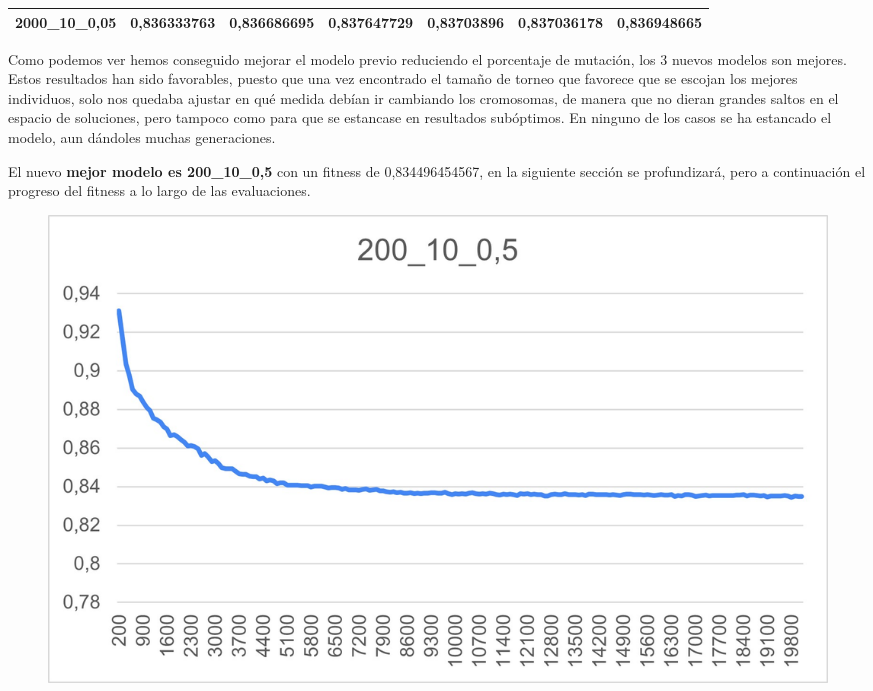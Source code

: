 \documentclass[12pt, spanish, pdftex]{UC3M_document}
\begin{document}
\begin{table}[H]
{\begin{tabular}{|l|l|l|l|l|l|l|}
			2000\_10\_0,05                                                                       & \cellcolor[HTML]{63BE7B}0,836333763                                            & \cellcolor[HTML]{B1D47F}0,836686695                                            & \cellcolor[HTML]{F8696B}0,837647729                                            & \cellcolor[HTML]{FFEB84}0,83703896                                             & \cellcolor[HTML]{FFEB84}0,837036178                                            & \cellcolor[HTML]{FDC67D}0,836948665                                                \\ \hline
		\end{tabular}%
	}
\end{table}

Como podemos ver hemos conseguido mejorar el modelo previo reduciendo el porcentaje de mutación, los 3 nuevos modelos son mejores. Estos resultados han sido favorables, puesto que una vez encontrado el tamaño de torneo que favorece que se escojan los mejores individuos, solo nos quedaba ajustar en qué medida debían ir cambiando los cromosomas, de manera que no dieran grandes saltos en el espacio de soluciones, pero tampoco como para que se estancase en resultados subóptimos. En ninguno de los casos se ha estancado el modelo, aun dándoles muchas generaciones.

El nuevo \textbf{mejor modelo es 200\_10\_0,5} con un fitness de 0,834496454567, en la siguiente sección se profundizará, pero a continuación el progreso del fitness a lo largo de las evaluaciones.

\begin{figure}[H]
	{\includegraphics[scale=.8]{./img/200_10_0,5.jpg}}
\end{figure}
\end{document}
